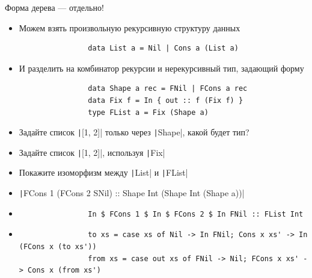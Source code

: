     \begin{frame}[fragile]{Форма дерева --- отдельно!}
        \begin{itemize}
            \item Можем взять произвольную рекурсивную структуру данных
            \begin{verbatim}
                data List a = Nil | Cons a (List a)
            \end{verbatim}
            \item И разделить на комбинатор рекурсии и нерекурсивный тип, задающий форму
            \begin{verbatim}
                data Shape a rec = FNil | FCons a rec
                data Fix f = In { out :: f (Fix f) }
                type FList a = Fix (Shape a)
            \end{verbatim}
            \item[\todo] Задайте список \texttt|[1, 2]| только через \texttt|Shape|, какой будет тип?
            \item[\todo] Задайте список \texttt|[1, 2]|, используя \texttt|Fix|
            \item[\todo] Покажите изоморфизм между \texttt|List| и \texttt|FList|
            \item[\answer] \pause \texttt|FCons 1 (FCons 2 SNil) :: Shape Int (Shape Int (Shape a))|
            \item[\answer] \pause
            \begin{verbatim}
                In $ FCons 1 $ In $ FCons 2 $ In FNil :: FList Int
            \end{verbatim}
            \item[\answer] \pause
            \begin{verbatim}
                to xs = case xs of Nil -> In FNil; Cons x xs' -> In (FCons x (to xs'))
                from xs = case out xs of FNil -> Nil; FCons x xs' -> Cons x (from xs')
            \end{verbatim}
        \end{itemize}
    \end{frame}

